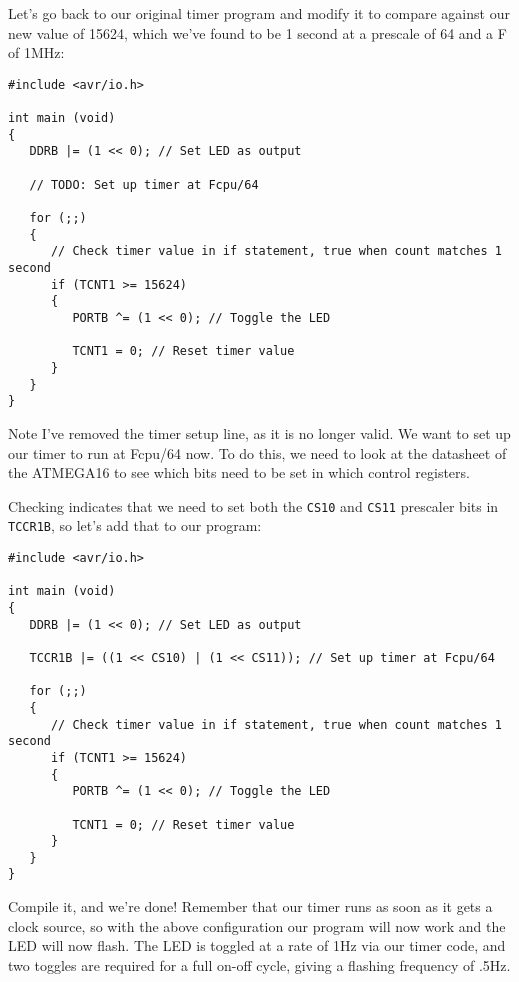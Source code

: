 \documentclass[a4paper,oneside,notitlepage]{book}
\begin{document}
Let's go back to our original timer program and modify it to compare against our new value of 15624, which we've found to be 1 second at a prescale of 64 and a F of 1MHz:

\begin{center}
\begin{lstlisting}
#include <avr/io.h>

int main (void)
{
   DDRB |= (1 << 0); // Set LED as output

   // TODO: Set up timer at Fcpu/64

   for (;;)
   {
      // Check timer value in if statement, true when count matches 1 second
      if (TCNT1 >= 15624)
      {
         PORTB ^= (1 << 0); // Toggle the LED

         TCNT1 = 0; // Reset timer value
      }
   }
}
\end{lstlisting}
\end{center}

Note I've removed the timer setup line, as it is no longer valid. We want to set up our timer to run at Fcpu/64 now. To do this, we need to look at the datasheet of the ATMEGA16 to see which bits need to be set in which control registers.

Checking indicates that we need to set both the \texttt{CS10} and \texttt{CS11} prescaler bits in \texttt{TCCR1B}, so let's add that to our program:

\begin{center}
\begin{lstlisting}
#include <avr/io.h>

int main (void)
{
   DDRB |= (1 << 0); // Set LED as output

   TCCR1B |= ((1 << CS10) | (1 << CS11)); // Set up timer at Fcpu/64

   for (;;)
   {
      // Check timer value in if statement, true when count matches 1 second
      if (TCNT1 >= 15624)
      {
         PORTB ^= (1 << 0); // Toggle the LED

         TCNT1 = 0; // Reset timer value
      }
   }
}
\end{lstlisting}
\end{center}

Compile it, and we're done! Remember that our timer runs as soon as it gets a clock source, so with the above configuration our program will now work and the LED will now flash. The LED is toggled at a rate of 1Hz via our timer code, and two toggles are required for a full on-off cycle, giving a flashing frequency of .5Hz.
\end{document}
